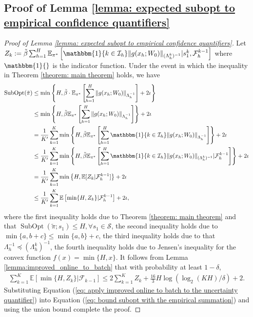 \documentclass{article} \usepackage{iclr2023/iclr2023_conference,times}
\DeclareMathOperator*{\subopt}{SubOpt}
\begin{document}
\subsection{Proof of Lemma \ref{lemma: expected subopt to empirical confidence quantifiers}}
\begin{proof}[Proof of Lemma \ref{lemma: expected subopt to empirical confidence quantifiers}]
Let $Z_k := \tilde{\beta}  \sum_{h=1}^H \mathbb{E}_{\pi^*} \left[ \mathbbm{1}\{k \in \mathcal{I}_h\} \| g(x_h; W_0) \|_{(\Lambda_h^k)^{-1}} | s_1^k, \mathcal{F}_h^{k-1} \right]$ where $\mathbbm{1}\{\}$ is the indicator function. Under the event in which the inequality in Theorem \ref{theorem: main theorem} holds, we have 
\begin{align}
   \subopt(\tilde{\pi}) &\leq \min \left\{H, \tilde{\beta} \cdot  \mathbb{E}_{\pi^*} \left[ \sum_{h=1}^H \| g(x_h; W_0) \|_{\Lambda_h^{-1}} \right] + 2 \iota  \right\} \nonumber\\ 
   &\leq \min \left\{H, \tilde{\beta} \mathbb{E}_{\pi^*} \left[ \sum_{h=1}^H \| g(x_h; W_0) \|_{\Lambda_h^{-1}} \right] \right\} + 2 \iota \nonumber\\
   &= \frac{1}{K'} \sum_{k=1}^K \min \left\{H, \tilde{\beta} \mathbb{E}_{\pi^*} \left[ \sum_{h=1}^H \mathbbm{1}\{k \in \mathcal{I}_h\} \| g(x_h; W_0) \|_{\Lambda_h^{-1}} \right] \right\} + 2 \iota \nonumber\\
   &\leq \frac{1}{K'} \sum_{k=1}^{K}  \min \left\{H, \tilde{\beta} \mathbb{E}_{\pi^*} \left[ \sum_{h=1}^H \mathbbm{1}\{k \in \mathcal{I}_h\} \| g(x_h; W_0) \|_{(\Lambda_h^k)^{-1}} | \mathcal{F}_h^{k-1} \right] \right\} + 2 \iota \nonumber\\
   &= \frac{1}{K'} \sum_{k=1}^{K} \min \left\{ H, \mathbb{E}[Z_k|\mathcal{F}_h^{k-1}] \right\} + 2 \iota \nonumber\\
   &\leq \frac{1}{K'} \sum_{k=1}^{K} \mathbb{E} \left[ \min \{H, Z_k  \} | \mathcal{F}_h^{k-1} \right] + 2 \iota,
   \label{eq: bound subopt with the empirical summation}
\end{align}
where the first inequality holds due to Theorem \ref{theorem: main theorem} and that $\subopt(\tilde{\pi}; s_1) \leq H, \forall s_1 \in \mathcal{S}$, the second inequality holds due to $\min \{a, b + c\} \leq \min\{a,b\} + c$, the third inequality holds due to that $\Lambda_h^{-1} \preceq (\Lambda_h^k)^{-1}$, the fourth inequality holds due to Jensen's inequality for the convex function $f(x) = \min\{H,x\}$. It follows from Lemma \ref{lemma:improved_online_to_batch} that with probability at least $1-\delta$, 
\begin{align}
    \sum_{k=1}^K \mathbb{E} \left[ \min \{H, Z_k  \} | \mathcal{F}_{k-1} \right] \leq 2 \sum_{k=1}^K Z_k + \frac{16}{3} H \log(\log_2(KH)/\delta) + 2. 
    \label{eq: apply improved online to batch to the uncertainty quantifier}
\end{align}
Substituting Equation (\ref{eq: apply improved online to batch to the uncertainty quantifier}) into Equation (\ref{eq: bound subopt with the empirical summation}) and using the union bound complete the proof.

\end{proof}
\end{document}
